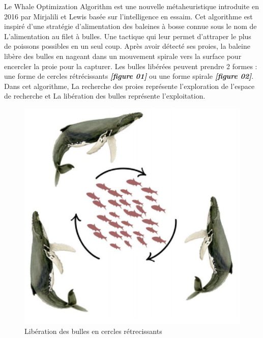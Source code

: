 \documentclass[12pt]{article}
\begin{document}
Le Whale Optimization Algorithm est une nouvelle métaheuristique introduite en 2016 par Mirjalili et Lewis basée sur l’intelligence en essaim. Cet algorithme est inspiré d’une stratégie d’alimentation des baleines à bosse connue sous le nom de L'alimentation au filet à bulles. Une tactique qui leur permet d’attraper le plus de poissons possibles en un seul coup. Après avoir détecté ses proies, la baleine libère des bulles en nageant dans un mouvement spirale vers la surface pour encercler la proie pour la capturer.
Les bulles libérées peuvent prendre 2 formes : une forme de cercles rétrécissants \textbf{\emph{[figure 01]}} ou une forme spirale \textbf{\emph{[figure 02]}}. 
Dans cet algorithme, La recherche des proies représente l’exploration de l’espace de recherche et La libération des bulles représente l’exploitation.
\begin{figure}[H] 
    \includegraphics[width=\linewidth]{../figures/cercles.png}
    \caption{Libération des bulles en cercles rétrecissants}
\end{figure}
\end{document}
